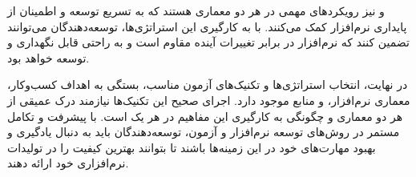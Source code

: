 و
نیز رویکردهای مهمی در هر دو معماری هستند که به تسریع توسعه و اطمینان از پایداری نرم‌افزار کمک می‌کنند. با به کارگیری این استراتژی‌ها، توسعه‌دهندگان می‌توانند تضمین کنند که نرم‌افزار در برابر تغییرات آینده مقاوم است و به راحتی قابل نگهداری و توسعه خواهد بود.

در نهایت، انتخاب استراتژی‌ها و تکنیک‌های آزمون مناسب، بستگی به اهداف کسب‌وکار، معماری نرم‌افزار، و منابع موجود دارد. اجرای صحیح این تکنیک‌ها نیازمند درک عمیقی از هر دو معماری و چگونگی به کارگیری این مفاهیم در هر یک است. با پیشرفت و تکامل مستمر در روش‌های توسعه نرم‌افزار و آزمون، توسعه‌دهندگان باید به دنبال یادگیری و بهبود مهارت‌های خود در این زمینه‌ها باشند تا بتوانند بهترین کیفیت را در تولیدات نرم‌افزاری خود ارائه دهند.

